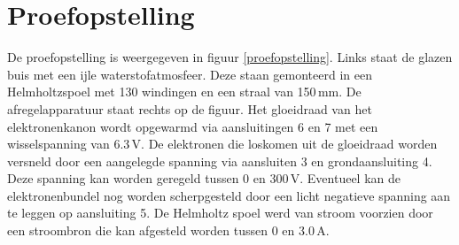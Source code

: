 \section{Proefopstelling}


De proefopstelling is weergegeven in figuur \ref{proefopstelling}. Links staat 
de glazen buis met een ijle waterstofatmosfeer. Deze staan gemonteerd in een 
Helmholtzspoel met 130 windingen en een straal van 150\,mm. De 
afregelapparatuur staat rechts op de figuur. Het gloeidraad van het 
elektronenkanon wordt opgewarmd via aansluitingen 6 en 7 met een wisselspanning 
van 6.3\,V. De elektronen die loskomen uit de gloeidraad worden versneld door 
een aangelegde spanning via aansluiten 3 en grondaansluiting 4. Deze spanning 
kan worden geregeld tussen 0 en 300\,V. Eventueel kan de elektronenbundel nog 
worden scherpgesteld door een licht negatieve spanning aan te leggen op 
aansluiting 5. De Helmholtz spoel werd van stroom voorzien door een stroombron 
die kan afgesteld worden tussen 0 en 3.0\,A.


